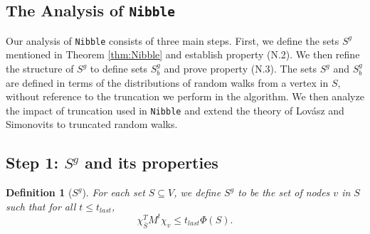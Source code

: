 \documentclass[11pt]{article}
\newtheorem{definition}[theorem]{Definition}
\def\form#1#2{#1^{T} #2}
\begin{document}
\subsection{The Analysis of \texttt{Nibble}}

Our analysis of \texttt{Nibble} consists of three main steps.
First, we define the sets $S^{g}$ mentioned in
  Theorem \ref{thm:Nibble} and establish property (N.2).
We then refine the structure of $S^{g}$ to
  define sets $S_{b}^{g}$ and prove property (N.3).
The sets $S^{g}$ and $S^{g}_{b}$ are defined in terms
  of the distributions of
  random walks from a vertex in $S$, without reference to the
  truncation we perform in the algorithm.
We then analyze the impact of truncation used in \texttt{Nibble}
  and extend the theory of Lov\'asz and Simonovits \cite{LovaszSimonovits}
  to truncated random walks.

\subsection*{Step 1: $S^{g}$ and its properties}



\begin{definition}[$S^{g}$]\label{def:sg}
For each set $S \subseteq V$, we define
  $S^{g}$ to be the set of nodes $v$ in $S$ such that
  for all $t \leq t_{last}$,
\[
  \form{\chi _{\bar{S}}}{M^{t} \chi _{v}}
\leq
  t_{last} \Phi (S).
\]
\end{definition}
\end{document}
